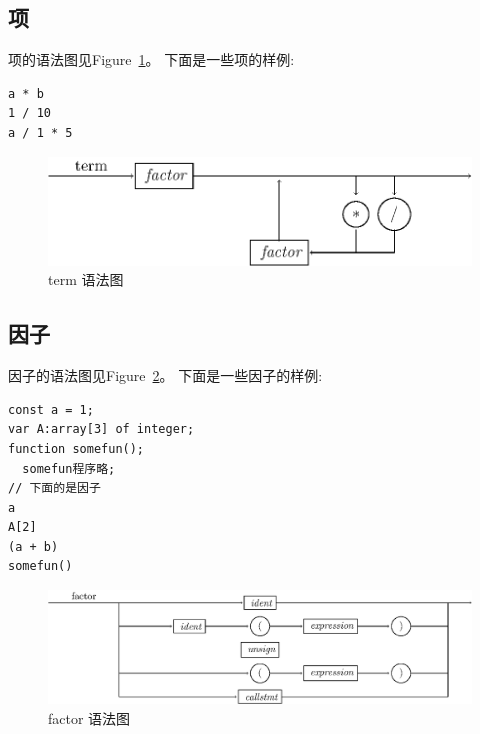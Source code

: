 \subsection{项}

项的语法图见Figure~\ref{term}。
下面是一些项的样例:
\begin{verbatim}
a * b
1 / 10
a / 1 * 5
\end{verbatim}
\begin{figure}[h!]
\begin{center}
    \includegraphics[scale=.8]{Figures/term.eps}
\end{center}
\caption{term 语法图}
\label{term}
\end{figure}
\subsection{因子}

因子的语法图见Figure~\ref{factor}。
下面是一些因子的样例:
\begin{verbatim}
const a = 1;
var A:array[3] of integer;
function somefun();
  somefun程序略;
// 下面的是因子
a 
A[2]
(a + b)
somefun()
\end{verbatim}
\begin{figure}[h!]
\begin{center}
    \includegraphics[scale=.8]{Figures/factor.eps}
\end{center}
\caption{factor 语法图}
\label{factor}
\end{figure}
